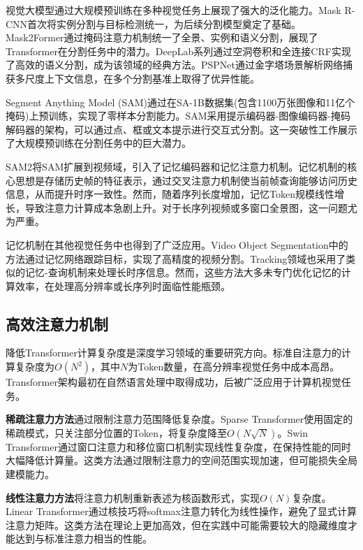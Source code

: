 视觉大模型通过大规模预训练在多种视觉任务上展现了强大的泛化能力。Mask R-CNN\cite{he2017mask}首次将实例分割与目标检测统一，为后续分割模型奠定了基础。Mask2Former\cite{cheng2022masked}通过掩码注意力机制统一了全景、实例和语义分割，展现了Transformer在分割任务中的潜力。DeepLab系列\cite{chen2017deeplab}通过空洞卷积和全连接CRF实现了高效的语义分割，成为该领域的经典方法。PSPNet\cite{zhao2017pyramid}通过金字塔场景解析网络捕获多尺度上下文信息，在多个分割基准上取得了优异性能。

Segment Anything Model (SAM)\cite{kirillov2023segment}通过在SA-1B数据集(包含1100万张图像和11亿个掩码)上预训练，实现了零样本分割能力。SAM采用提示编码器-图像编码器-掩码解码器的架构，可以通过点、框或文本提示进行交互式分割。这一突破性工作展示了大规模预训练在分割任务中的巨大潜力。

SAM2\cite{ravi2025sam2}将SAM扩展到视频域，引入了记忆编码器和记忆注意力机制。记忆机制的核心思想是存储历史帧的特征表示，通过交叉注意力机制使当前帧查询能够访问历史信息，从而提升时序一致性。然而，随着序列长度增加，记忆Token规模线性增长，导致注意力计算成本急剧上升。对于长序列视频或多窗口全景图，这一问题尤为严重。

记忆机制在其他视觉任务中也得到了广泛应用。Video Object Segmentation中的方法通过记忆网络跟踪目标，实现了高精度的视频分割。Tracking领域也采用了类似的记忆-查询机制来处理长时序信息。然而，这些方法大多未专门优化记忆的计算效率，在处理高分辨率或长序列时面临性能瓶颈。

\subsection{高效注意力机制}

降低Transformer计算复杂度是深度学习领域的重要研究方向。标准自注意力\cite{vaswani2017attention}的计算复杂度为$O(N^2)$，其中$N$为Token数量，在高分辨率视觉任务中成本高昂。Transformer架构\cite{vaswani2017attention}最初在自然语言处理中取得成功，后被广泛应用于计算机视觉任务。

\textbf{稀疏注意力方法}通过限制注意力范围降低复杂度。Sparse Transformer\cite{child2019generating}使用固定的稀疏模式，只关注部分位置的Token，将复杂度降至$O(N\sqrt{N})$。Swin Transformer\cite{liu2021swin}通过窗口注意力和移位窗口机制实现线性复杂度，在保持性能的同时大幅降低计算量。这类方法通过限制注意力的空间范围实现加速，但可能损失全局建模能力。

\textbf{线性注意力方法}将注意力机制重新表述为核函数形式，实现$O(N)$复杂度。Linear Transformer\cite{katharopoulos2020transformers}通过核技巧将softmax注意力转化为线性操作，避免了显式计算注意力矩阵。这类方法在理论上更加高效，但在实践中可能需要较大的隐藏维度才能达到与标准注意力相当的性能。

